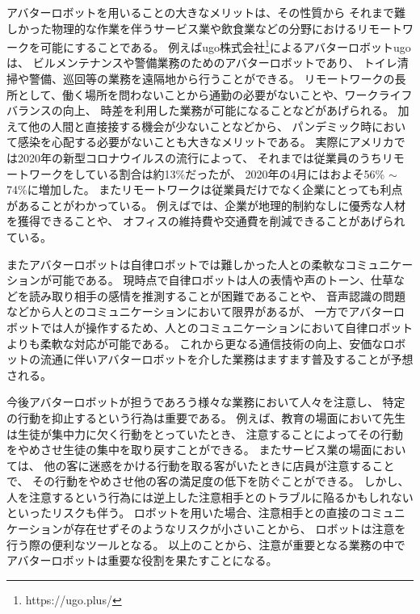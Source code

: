 \documentclass{kuisthesis}
\begin{document}
アバターロボットを用いることの大きなメリットは、その性質から
それまで難しかった物理的な作業を伴うサービス業や飲食業などの分野におけるリモートワークを可能にすることである。
例えばugo株式会社\footnote{https://ugo.plus/}によるアバターロボットugoは、
ビルメンテナンスや警備業務のためのアバターロボットであり、
トイレ清掃や警備、巡回等の業務を遠隔地から行うことができる。
リモートワークの長所として、働く場所を問わないことから通勤の必要がないことや、ワークライフバランスの向上、
時差を利用した業務が可能になることなどがあげられる。
加えて他の人間と直接接する機会が少ないことなどから、
パンデミック時において感染を心配する必要がないことも大きなメリットである。
実際にアメリカでは2020年の新型コロナウイルスの流行によって、
それまでは従業員のうちリモートワークをしている割合は約13\%だったが、
2020年の4月にはおよそ56\% $\sim$ 74\%に増加した\cite{ozimek2020future}。
またリモートワークは従業員だけでなく企業にとっても利点があることがわかっている。
例えば\cite{FERREIRA202170}では、企業が地理的制約なしに優秀な人材を獲得できることや、
オフィスの維持費や交通費を削減できることがあげられている。

またアバターロボットは自律ロボットでは難しかった人との柔軟なコミュニケーションが可能である。
現時点で自律ロボットは人の表情や声のトーン、仕草などを読み取り相手の感情を推測することが困難であることや、
音声認識の問題などから人とのコミュニケーションにおいて限界があるが、
一方でアバターロボットでは人が操作するため、人とのコミュニケーションにおいて自律ロボットよりも柔軟な対応が可能である。
これから更なる通信技術の向上、安価なロボットの流通に伴いアバターロボットを介した業務はますます普及することが予想される。

今後アバターロボットが担うであろう様々な業務において人々を注意し、
特定の行動を抑止するという行為は重要である。
例えば、教育の場面において先生は生徒が集中力に欠く行動をとっていたとき、
注意することによってその行動をやめさせ生徒の集中を取り戻すことができる。
またサービス業の場面においては、
他の客に迷惑をかける行動を取る客がいたときに店員が注意することで、
その行動をやめさせ他の客の満足度の低下を防ぐことができる。
しかし、人を注意するという行為には逆上した注意相手とのトラブルに陥るかもしれないといったリスクも伴う。
ロボットを用いた場合、注意相手との直接のコミュニケーションが存在せずそのようなリスクが小さいことから、
ロボットは注意を行う際の便利なツールとなる。
以上のことから、注意が重要となる業務の中でアバターロボットは重要な役割を果たすことになる。
\end{document}
